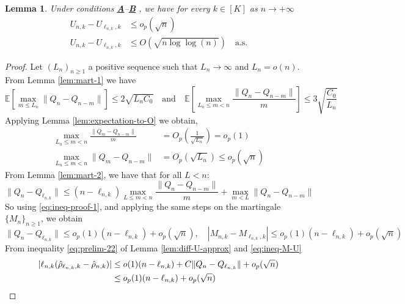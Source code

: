\documentclass[11pt]{article}
\theoremstyle{plain}
\newtheorem{lemma}[theorem]{Lemma}
\theoremstyle{definition}
\begin{document}
\begin{appendix}
\begin{lemma}\label{lem:U-ineq}
	Under conditions \hyperlink{CA}{\textbf{A}}--\hyperlink{CB}{\textbf{B}} , we have for every \(k \in [K]\) as \(n \to +\infty\)	
	\begin{align}
		U_{n,k} - U_{\ell_{n,k},k} &\leq o_p(\sqrt{n})\label{eq:ineq-U-1}\\
		U_{n,k} - U_{\ell_{n,k},k} &\leq O(\sqrt{n \log \log(n)}) \quad \text{a.s.}\label{eq:ineq-U-2}
	\end{align}
\end{lemma}	
\begin{proof}
	Let \((L_n)_{n \geq 1}\) a positive sequence such that $L_n \to \infty$ and $L_n = o(n)$. From Lemma \ref{lem:mart-1} we have
	\begin{equation*}
		\mathbb{E}\left[\max_{m \leq L_n} \|Q_n - Q_{n-m}\| \right] \leq 2\sqrt{L_n C_0}
		\quad \text{and} \quad \mathbb{E}\left[\max_{L_n \leq m < n} \frac{\|Q_n - Q_{n-m}\|}{m} \right] \leq 3\sqrt{\frac{C_0}{L_n}}  
	\end{equation*}
	Applying Lemma \ref{lem:expectation-to-O} we obtain,
	\begin{align*}
		\max_{L_n \leq m < n} \frac{\|Q_m - Q_{n-m}\|}{m} &= O_p\left(\frac{1}{\sqrt{L_n}}\right) = o_p(1)\\ 
		\max_{L_n \leq m < n} \|Q_m - Q_{n-m}\| &= O_p(\sqrt{L_n}) \leq o_p(\sqrt{n})
	\end{align*}
	From Lemma \ref{lem:mart-2}, we have that for all \(L < n\):
	\begin{equation}\label{eq:ineq-proof-1}
		\|Q_n - Q_{\ell_{n,k}}\| \leq (n - \ell_{n,k}) \max_{L \leq m < n} \frac{\|Q_n - Q_{n-m}\|}{m} + \max_{m < L} \|Q_n - Q_{n-m}\|
	\end{equation}
	So using \eqref{eq:ineq-proof-1}, and applying the same steps on the martingale \(\{M_n\}_{n \geq 1}\), we obtain
	\begin{equation}\label{eq:ineq-M-U}
		\|Q_n - Q_{\ell_{n,k}}\| \leq o_p(1)(n - \ell_{n,k}) + o_p(\sqrt{n}), \quad |M_{n,k} - M_{\ell_{n,k},k}| \leq o_p(1)(n - \ell_{n,k}) + o_p(\sqrt{n})
	\end{equation}	
	From inequality \eqref{eq:prelim-22} of Lemma \ref{lem:diff-U-approx} and \eqref{eq:ineq-M-U}
	\begin{align}
		|\ell_{n,k} (\hat{\rho}_{\ell_{n,k},k} - \hat{\rho}_{n,k})| &\leq o(1)(n - \ell_{n,k}) + C \|Q_n - Q_{\ell_{n,k}}\| + o_p(\sqrt{n})\notag\\
		&\leq o_p(1)(n - \ell_{n,k}) + o_p(\sqrt{n})\label{eq:ineq_ell}
	\end{align}

\end{proof}
\end{appendix}
\end{document}
